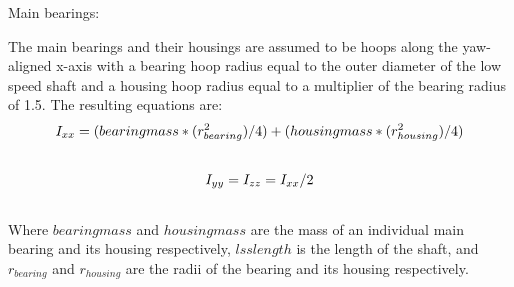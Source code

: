 \documentclass[letterpaper,10pt,openany,oneside]{sphinxmanual}
\begin{document}
Main bearings:

The main bearings and their housings are assumed to be hoops along the yaw-aligned x-axis with a bearing hoop radius equal to the outer diameter of the low speed shaft and a housing hoop radius equal to a multiplier of the bearing radius of 1.5.  The resulting equations are:
\begin{gather}
\begin{split}I_{xx}=(bearingmass * (r_{bearing}^2) / 4) + (housingmass * (r_{housing}^2) / 4)\end{split}\notag\\\begin{split}\end{split}\notag
\end{gather}\begin{gather}
\begin{split}I_{yy}=I_{zz}=I_{xx}/2\end{split}\notag\\\begin{split}\end{split}\notag
\end{gather}
Where $bearingmass$ and $housingmass$ are the mass of an individual main bearing and its housing respectively, $lsslength$ is the length of the shaft, and $r_{bearing}$ and $r_{housing}$ are the radii of the bearing and its housing respectively.
\end{document}
